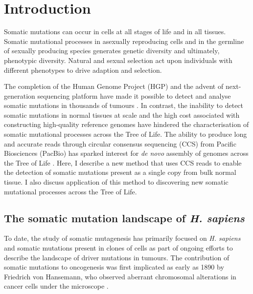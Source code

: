 
\chapter{Introduction}  %

\ifpdf
    \graphicspath{{Chapter1/Figs/Raster/}{Chapter1/Figs/PDF/}{Chapter1/Figs/}}
\else
    \graphicspath{{Chapter1/Figs/Vector/}{Chapter1/Figs/}}
\fi

Somatic mutations can occur in cells at all stages of life and in all tissues. Somatic mutational processes in asexually reproducing cells and in the germline of sexually producing species generates genetic diversity and ultimately, phenotypic diversity. Natural and sexual selection act upon individuals with different phenotypes to drive adaption and selection. 

The completion of the Human Genome Project (HGP) \cite{Lander2001-du} and the advent of next-generation sequencing platform \cite{Bentley2008-kl} have made it possible to detect and analyse somatic mutations in thousands of tumours \cite{Weinstein2013-ko, ICGCTCGA_Pan-Cancer_Analysis_of_Whole_Genomes_Consortium2020-ts}. In contrast, the inability to detect somatic mutations in normal tissues at scale and the high cost associated with constructing high-quality reference genomes have hindered the characterisation of somatic mutational processes across the Tree of Life. The ability to produce long and accurate reads through circular consensus sequencing (CCS) from Pacific Biosciences (PacBio) \cite{Wenger2019-pw} has sparked interest for \textit{de novo} assembly of genomes across the Tree of Life \cite{Darwin_Tree_of_Life_Project_Consortium2022-ma}. Here, I describe a new method that uses CCS reads to enable the detection of somatic mutations present as a single copy from bulk normal tissue. I also discuss application of this method to discovering new somatic mutational processes across the Tree of Life. 

\section{The somatic mutation landscape of \textit{H. sapiens}}

To date, the study of somatic mutagenesis has primarily focused on \textit{H. sapiens} and somatic mutations present in clones of cells as part of ongoing efforts to describe the landscape of driver mutations in tumours. The contribution of somatic mutations to oncogenesis was first implicated as early as 1890 by Friedrich von Hansemann, who observed aberrant chromosomal alterations in cancer cells under the microscope \cite{hansemann_1890}.

